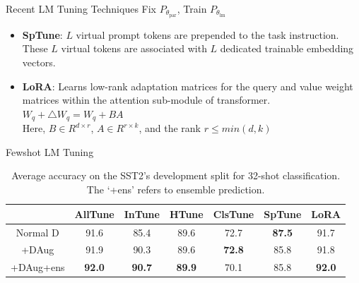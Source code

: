 \documentclass{beamer}
\begin{document}
\begin{frame}{Recent LM Tuning Techniques}
Fix $P_{\theta_{\text{par}}}$, Train $P_{\theta_{\text{lm}}}$
\medskip
\medskip
    \begin{itemize}
        \item \textbf{SpTune}: $L$ virtual prompt tokens are prepended to the task instruction. \\ These $L$ virtual tokens are associated with $L$ dedicated trainable embedding vectors.
        \medskip
        \medskip
        \item \textbf{LoRA}: Learns low-rank adaptation matrices for the query and value weight matrices within the attention sub-module of transformer.\\
        \medskip
        $W_q + \triangle W_q = W_q + BA$ \\
        Here, $B \in R^{d \times r}$, $A \in R^{r \times k}$, and the rank $r \le min(d, k)$
    \end{itemize}
\end{frame}

\begin{frame}{Fewshot LM Tuning}

\begin{table}
\centering
\caption{Average accuracy on the SST2's development split for 32-shot classification. The `+ens' refers to ensemble prediction.}
\begin{tabular}{c | c | c | c | c | c | c}
\hline
 & AllTune & InTune & HTune & ClsTune & SpTune & LoRA \\
\hline
Normal D & \small91.6 & \small85.4 & \small89.6 & \small72.7 & \small\textbf{87.5} & \small91.7 \\
\small+DAug & \small91.9 & \small90.3 & \small89.6 & \small\textbf{72.8} & \small85.8 & \small91.8 \\
\small+DAug+ens & \small\textbf{92.0} & \small\textbf{90.7} & \small\textbf{89.9} & \small70.1 & \small85.8 & \small\textbf{92.0}\\
\hline
\end{tabular}
\label{lmfps-vs-dataaug-vs-main-128-shot}
\end{table}
\end{frame}
\end{document}
